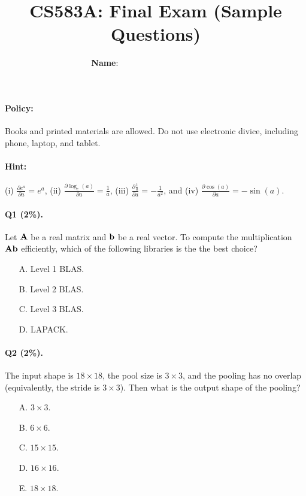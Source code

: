 \documentclass[11pt]{article}
\numberwithin{equation}{section}
\def\A{{\bf A}}
\def\bb{{\bf b}}
\begin{document}


\title{CS583A: Final Exam (Sample Questions)}

\author{{\bf Name}: ~~~~~~~~~\qquad ~~~~~ \qquad~~~~~~~~~}

\date{ }

\maketitle



\paragraph{Policy:}
Books and printed materials are allowed. Do not use electronic divice, including phone, laptop, and tablet.

\paragraph{Hint:} (i) $\frac{\partial  e^a}{\partial a} = e^a$, (ii) $\frac{ \partial \log_e (a) }{\partial a  } = \frac{1}{a}$, (iii) $\frac{ \partial \frac{1}{a} }{\partial a  } = - \frac{1}{a^2}$, and (iv) $\frac{ \partial \cos (a) }{\partial a  } = - \sin (a)$.



\paragraph{Q1 (2\%).} 
Let $\A$ be a real matrix and $\bb$ be a real vector.
To compute the multiplication $\A \bb$ efficiently,
which of the following libraries is the the best choice?
\begin{itemize}
	\item[A.]
	Level 1 BLAS.
	\item[B.]
	Level 2 BLAS.
	\item[C.]
	Level 3 BLAS.
	\item[D.]
	LAPACK.
\end{itemize}


\paragraph{Q2 (2\%).} 
The input shape is $18\times 18$, the pool size is $3\times 3$, and the pooling has no overlap (equivalently, the stride is $3\times 3$).
Then what is the output shape of the pooling?
\begin{itemize}
	\item[A.]
	$3\times 3$.
	\item[B.]
	$6\times 6$.
	\item[C.]
	$15\times 15$.
	\item[D.]
	$16\times 16$.
	\item[E.]
	$18\times 18$.
\end{itemize}
\end{document}
